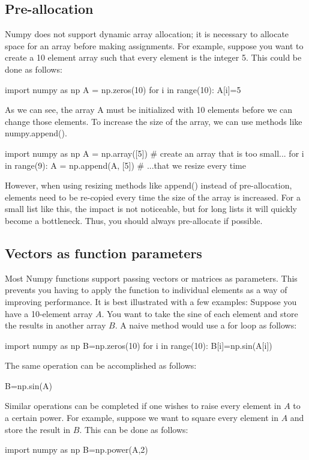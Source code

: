 \documentclass{article}
\begin{document}
\subsection{Pre-allocation}
Numpy does not support dynamic array allocation; it is necessary to allocate space for an array before making assignments. For example, suppose you want to create a 10 element array such that every element is the integer 5. This could be done as follows:
\begin{python}
import numpy as np
A = np.zeros(10)
for i in range(10):
    A[i]=5
\end{python}

As we can see, the array A must be initialized with 10 elements before we can change those elements. To increase the size of the array, we can use methods like numpy.append(). 
\begin{python}
import numpy as np
A = np.array([5]) # create an array that is too small...
for i in range(9):
    A = np.append(A, [5]) # ...that we resize every time
\end{python}

However, when using resizing methods like append() instead of pre-allocation, elements need to be re-copied every time the size of the array is increased. For a small list like this, the impact is not noticeable, but for long lists it will quickly become a bottleneck. Thus, you should always pre-allocate if possible.

\subsection{Vectors as function parameters}
Most Numpy functions support passing vectors or matrices as parameters. This prevents you having to apply the function to individual elements as a way of improving performance. It is best illustrated with a few examples:
Suppose you have a 10-element array $A$. You want to take the sine of each element and store the results in another array $B$. A naive method would use a for loop as follows:
\begin{python}
import numpy as np
B=np.zeros(10)
for i in range(10):
    B[i]=np.sin(A[i])
\end{python}

The same operation can be accomplished as follows:
\begin{python}
B=np.sin(A)
\end{python}

Similar operations can be completed if one wishes to raise every element in $A$ to a certain power. For example, suppose we want to square every element in $A$ and store the result in $B$. This can be done as follows:
\begin{python}
import numpy as np
B=np.power(A,2)
\end{python}
\end{document}

